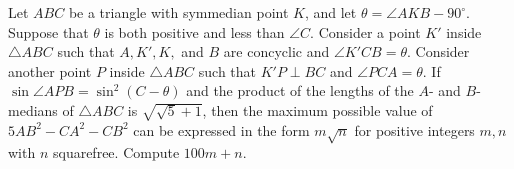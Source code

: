 Let $ABC$ be a triangle with symmedian point $K$, and let $\theta = \angle AKB-90^{\circ}$. Suppose that $\theta$ is both positive and less than $\angle C$. Consider a point $K'$ inside $\triangle ABC$ such that $A,K',K,$ and $B$ are concyclic and $\angle K'CB=\theta$. Consider another point $P$ inside $\triangle ABC$ such that $K'P\perp BC$ and $\angle PCA=\theta$. If $\sin \angle APB = \sin^2 (C-\theta)$ and the product of the lengths of the $A$- and $B$-medians of $\triangle ABC$ is $\sqrt{\sqrt{5}+1}$, then the maximum possible value of $5AB^2-CA^2-CB^2$ can be expressed in the form $m\sqrt{n}$ for positive integers $m,n$ with $n$ squarefree. Compute $100m+n$.
